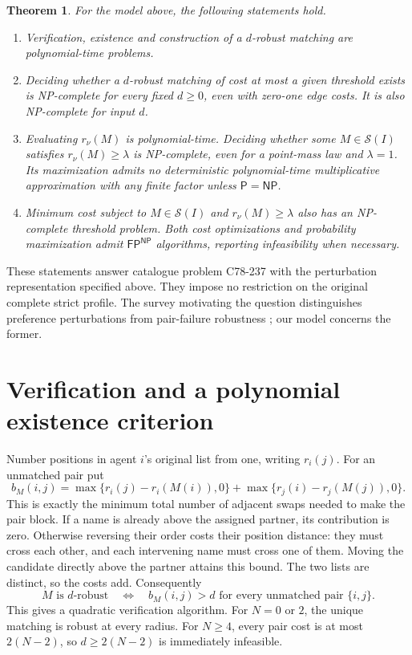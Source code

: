 \documentclass[11pt]{article}
\newtheorem{theorem}{Theorem}
\newcommand{\NP}{\mathsf{NP}}
\newcommand{\FP}{\mathsf{FP}}
\begin{document}
\begin{theorem}\label{classification}
For the model above, the following statements hold.
\begin{enumerate}
\item Verification, existence and construction of a $d$-robust matching
      are polynomial-time problems.
\item Deciding whether a $d$-robust matching of cost at most a given
      threshold exists is NP-complete for every fixed $d\geq0$, even
      with zero-one edge costs. It is also NP-complete for input $d$.
\item Evaluating $r_\nu(M)$ is polynomial-time. Deciding whether some
      $M\in\mathcal S(I)$ satisfies $r_\nu(M)\geq\lambda$ is NP-complete,
      even for a point-mass law and $\lambda=1$. Its maximization admits
      no deterministic polynomial-time multiplicative approximation
      with any finite factor unless $\mathsf P=\NP$.
\item Minimum cost subject to $M\in\mathcal S(I)$ and
      $r_\nu(M)\geq\lambda$ also has an NP-complete threshold problem.
      Both cost optimizations and probability maximization admit
      $\FP^{\NP}$ algorithms, reporting infeasibility when necessary.
\end{enumerate}
\end{theorem}

These statements answer catalogue problem C78-237 with the perturbation
representation specified above. They impose no restriction on the
original complete strict profile. The survey motivating the question
distinguishes preference perturbations from pair-failure robustness
\cite[\S3.3.2]{survey}; our model concerns the former.

\section{Verification and a polynomial existence criterion}
Number positions in agent $i$'s original list from one, writing $r_i(j)$.
For an unmatched pair put
\[
 b_M(i,j)=\max\{r_i(j)-r_i(M(i)),0\}
          +\max\{r_j(i)-r_j(M(j)),0\}.
\]
This is exactly the minimum total number of adjacent swaps needed to
make the pair block. If a name is already above the assigned partner,
its contribution is zero. Otherwise reversing their order costs their
position distance: they must cross each other, and each intervening
name must cross one of them. Moving the candidate directly above the
partner attains this bound. The two lists are distinct, so the costs add.
Consequently
\begin{equation}\label{radius}
 M\text{ is }d\text{-robust}
 \quad\Longleftrightarrow\quad
 b_M(i,j)>d\text{ for every unmatched pair }\{i,j\}.
\end{equation}
This gives a quadratic verification algorithm. For $N=0$ or $2$, the
unique matching is robust at every radius. For $N\geq4$, every pair cost
is at most $2(N-2)$, so $d\geq2(N-2)$ is immediately infeasible.
\end{document}
